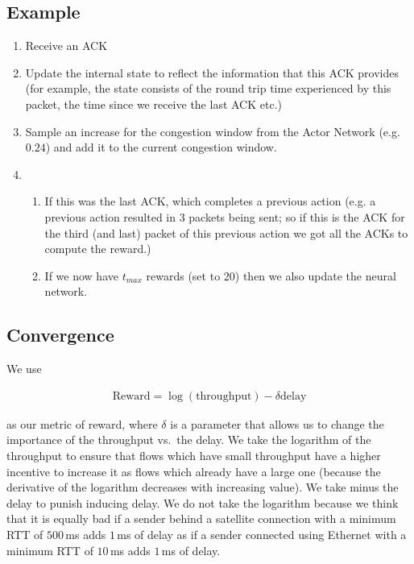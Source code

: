 \documentclass[sigconf]{acmart}
\begin{document}
\subsection{Example}

\begin{enumerate}
\item Receive an ACK
\item Update the internal state to reflect the information that this ACK provides (for example, the state consists of the round trip time experienced by this packet, the time since we receive the last ACK etc.)
\item Sample an increase for the congestion window from the Actor Network (e.g. $0.24$) and add it to the current congestion window.
\item 
\begin{enumerate}
\item If this was the last ACK, which completes a previous action (e.g. a previous action resulted in $3$ packets being sent; so if this is the ACK for the third (and last) packet of this previous action we got all the ACKs to compute the reward.)
\item If we now have $t_{max}$ rewards (set to 20) then we also update the neural network. 
\end{enumerate}

\end{enumerate}

\subsection{Convergence}

We use 

\begin{align*}
\text{Reward} = \log(\text{throughput}) - \delta\text{delay}
\end{align*}

as our metric of reward, where $\delta$ is a parameter that allows us to change the importance of the throughput vs.~the delay. We take the logarithm of the throughput to ensure that flows which have small throughput have a higher incentive to increase it as flows which already have a large one (because the derivative of the logarithm decreases with increasing value). We take minus the delay to punish inducing delay. We do not take the logarithm because we think that it is equally bad if a sender behind a satellite connection with a minimum RTT of $500\,$ms adds $1\,$ms of delay as if a sender connected using Ethernet with a minimum RTT of $10\,$ms adds $1\,$ms of delay. 
\end{document}
